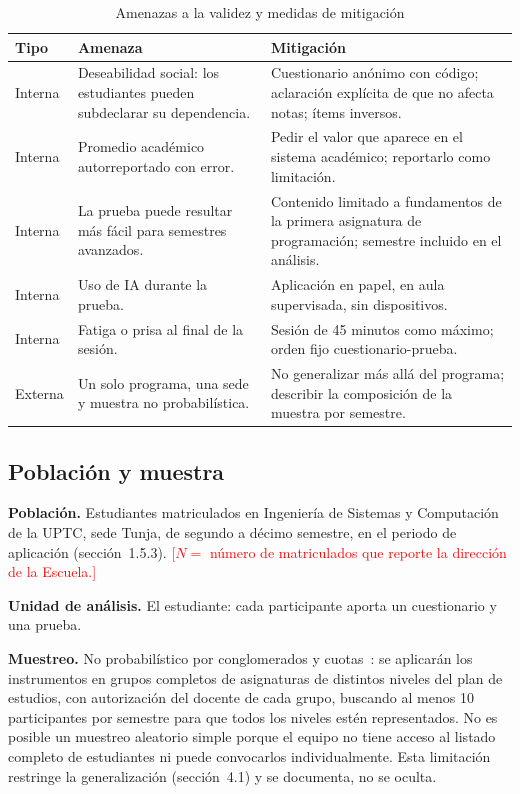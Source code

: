 \documentclass[12pt,letterpaper]{article}
\numberwithin{table}{section}
\numberwithin{figure}{section}
\newcommand{\pendiente}[1]{\textcolor{red}{[#1]}}
\begin{document}
\begin{table}[ht]
\centering
\caption{Amenazas a la validez y medidas de mitigación}
\label{tab:amenazas}
\footnotesize
\begin{tabular}{@{}p{1.6cm}p{5.2cm}p{5.6cm}@{}}
\toprule
\textbf{Tipo} & \textbf{Amenaza} & \textbf{Mitigación} \\
\midrule
Interna & Deseabilidad social: los estudiantes pueden subdeclarar su dependencia. & Cuestionario anónimo con código; aclaración explícita de que no afecta notas; ítems inversos. \\
Interna & Promedio académico autorreportado con error. & Pedir el valor que aparece en el sistema académico; reportarlo como limitación. \\
Interna & La prueba puede resultar más fácil para semestres avanzados. & Contenido limitado a fundamentos de la primera asignatura de programación; semestre incluido en el análisis. \\
Interna & Uso de IA durante la prueba. & Aplicación en papel, en aula supervisada, sin dispositivos. \\
Interna & Fatiga o prisa al final de la sesión. & Sesión de 45 minutos como máximo; orden fijo cuestionario-prueba. \\
Externa & Un solo programa, una sede y muestra no probabilística. & No generalizar más allá del programa; describir la composición de la muestra por semestre. \\
\bottomrule
\end{tabular}
\end{table}

\subsection{Población y muestra}

\textbf{Población.} Estudiantes matriculados en Ingeniería de Sistemas y Computación de la UPTC, sede Tunja, de segundo a décimo semestre, en el periodo de aplicación (sección~1.5.3). \pendiente{$N =$ número de matriculados que reporte la dirección de la Escuela.}

\textbf{Unidad de análisis.} El estudiante: cada participante aporta un cuestionario y una prueba.

\textbf{Muestreo.} No probabilístico por conglomerados y cuotas~\cite{hernandez2014metodologia}: se aplicarán los instrumentos en grupos completos de asignaturas de distintos niveles del plan de estudios, con autorización del docente de cada grupo, buscando al menos 10 participantes por semestre para que todos los niveles estén representados. No es posible un muestreo aleatorio simple porque el equipo no tiene acceso al listado completo de estudiantes ni puede convocarlos individualmente. Esta limitación restringe la generalización (sección~4.1) y se documenta, no se oculta.
\end{document}
